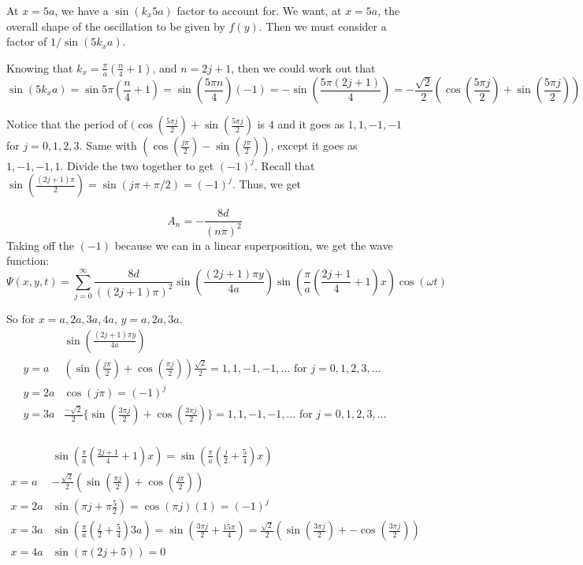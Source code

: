 \documentclass[twoside,10pt]{amsart}
\begin{document}
At $x = 5a$, we have a $\sin{(k_x 5a)}$ factor to account for.  We want, at $x=5a$, the overall shape of the oscillation to be given by $f(y)$.  Then we must consider a factor of $1/\sin{(5k_x a)}$.  

Knowing that $k_x = \frac{\pi}{a} \left( \frac{n}{4} +1 \right)$, and $ n =2j+1$, then we could work out that 
\[
\sin{ (5 k_x a)} = \sin{ 5 \pi \left( \frac{n}{4} + 1 \right) } = \sin{ \left( \frac{ 5 \pi n }{4} \right) }(-1) = - \sin{ \left( \frac{ 5 \pi (2j+1) }{4} \right) } = - \frac{ \sqrt{2} }{2} ( \cos{ \left( \frac{ 5 \pi j }{2} \right) } + \sin{ \left( \frac{ 5 \pi j }{2} \right) } )  
\]

Notice that the period of $(\cos{ \left( \frac{5\pi j}{2} \right) } + \sin{ \left( \frac{ 5 \pi j }{2} \right) }$ is $4$ and it goes as $1,1,-1,-1$ for $j=0,1,2,3$.  Same with $(\cos{ \left( \frac{j\pi}{2} \right) } - \sin{ \left( \frac{ j\pi}{2} \right) } )$, except it goes as $1,-1,-1,1$.  Divide the two together to get $(-1)^j$.  Recall that $ \sin{ \left( \frac{ (2j+1) \pi}{2} \right) } = \sin{ (j\pi + \pi/2 )} = (-1)^j$.  Thus, we get

\[
 A_n = - \frac{8d}{ (n\pi)^2} 
\]
Taking off the $(-1)$ because we can in a linear superposition, we get the wave function:
\[
\boxed{ \Psi{(x,y,t)} = \sum_{j=0}^{\infty} \frac{ 8 d}{ ( (2j+1)\pi)^2 } \sin{ \left( \frac{ (2j+1)\pi y}{ 4a} \right) }\sin{ \left( \frac{\pi}{a} \left( \frac{ 2j+1}{4} + 1 \right) x  \right)} \cos{ (\omega t)} }
\]

So for $x = a,2a,3a, 4a$, $y=a,2a,3a$.  
\[
\begin{matrix} & \sin{ \left( \frac{ (2j+1) \pi y }{4a} \right) } \\ y = a &  (\sin{ \left( \frac{j\pi}{2} \right)} + \cos{ \left( \frac{ \pi j}{2} \right) } ) \frac{ \sqrt{2}}{2} = 1,1, -1,-1, \dots \text{ for } j = 0,1,2,3, \dots \\
  y = 2a & \cos{(j\pi)} = (-1)^j \\ 
  y = 3a & \frac{-\sqrt{2}}{2} \{ \sin{ \left( \frac{ 3 \pi j}{2}  \right)} + \cos{ \left( \frac{ 3\pi j}{2} \right)} \} = 1,1,-1,-1, \dots \text{ for } j = 0,1,2,3,\dots \end{matrix}
\]
\quad \\
\[
\begin{matrix} 
& \sin{ \left( \frac{ \pi}{a} \left( \frac{2j+1}{4} + 1 \right) x \right) } = \sin{ \left( \frac{ \pi}{a} \left( \frac{j}{2} + \frac{5}{4} \right) x \right) } \\ 
  x =a &  - \frac{\sqrt{2}}{2} (\sin{ \left( \frac{\pi j}{2} \right) } + \cos{ \left( \frac{ j \pi}{2} \right) } ) \\ 
  x = 2a & \sin{ (\pi j + \pi \frac{5}{2} ) } = \cos{(\pi j)}(1) = (-1)^j \\ 
  x = 3 a & \sin{ \left( \frac{\pi}{a} \left( \frac{j}{2} + \frac{5}{4} \right)  3a \right) } = \sin{ \left( \frac{3\pi j }{2} + \frac{15 \pi}{4} \right) } = \frac{\sqrt{2}}{2} \left( \sin{ \left( \frac{ 3\pi j}{2} \right) } + - \cos{ \left( \frac{3 \pi j}{2} \right) } \right) \\
  x = 4a & \sin{ ( \pi (2j+5) ) } =0 
\end{matrix}
\]
\end{document}
